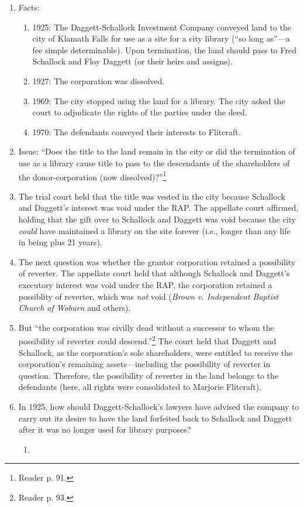 \begin{enumerate}
    \item Facts:
    \begin{enumerate}
        \item 1925: The Daggett-Schallock Investment Company conveyed land to 
        the city of Klamath Falls for use as a site for a city library (``so 
        long as''---a fee simple determinable). Upon termination, the land 
        should pass to Fred Schallock and Floy Daggett (or their heirs and 
        assigns).
        \item 1927: The corporation was dissolved.
        \item 1969: The city stopped using the land for a library. The city 
        asked the court to adjudicate the rights of the parties under the 
        deed.
        \item 1970: The defendants conveyed their interests to Flitcraft.
    \end{enumerate}
    \item Issue: ``Does the title to the land remain in the city or did the 
    termination of use as a library cause title to pass to the descendants of 
    the shareholders of the donor-corporation (now 
    dissolved)?''\footnote{Reader p. 91.}
    \item The trial court held that the title was vested in the city because 
    Schallock and Daggett's interest was void under the RAP. The appellate 
    court affirmed, holding that the gift over to Schallock and Daggett was 
    void because the city \emph{could} have maintained a library on the site 
    forever (i.e., longer than any life in being plus 21 years).
    \item The next question was whether the grantor corporation retained a 
    possibility of reverter. The appellate court held that although Schallock 
    and Daggett's executory interest was void under the RAP, the corporation 
    retained a possiblity of reverter, which was \emph{not} void (\emph{Brown 
    v. Independent Baptist Church of Woburn} and others).
    \item But ``the corporation was civilly dead without a successor to whom 
    the possibility of reverter could descend.''\footnote{Reader p. 93.} The 
    court held that Daggett and Schallock, as the corporation's sole 
    shareholders, were entitled to receive the corporation's remaining 
    assets---including the possibility of reverter in question. Therefore, the 
    possibility of reverter in the land belongs to the defendants (here, all 
    rights were consolidated to Marjorie Flitcraft).
    \item In 1925, how should Daggett-Schallock's lawyers have advised the 
    company to carry out its desire to have the land forfeited back to 
    Schallock and Daggett after it was no longer used for library purposes?
    \begin{enumerate}
        \item %
    \end{enumerate}
\end{enumerate}

